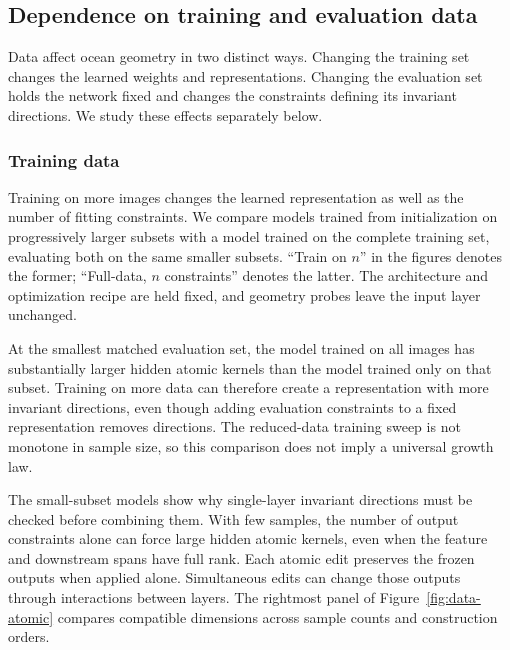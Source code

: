 

\subsection{Dependence on training and evaluation data}
\label{app:data-dependence}
Data affect ocean geometry in two distinct ways. Changing the training set changes the learned weights and representations. Changing the evaluation set holds the network fixed and changes the constraints defining its invariant directions. We study these effects separately below.

\subsubsection{Training data}
\label{app:training-data}
Training on more images changes the learned representation as well as the number of fitting constraints. We compare models trained from initialization on progressively larger subsets with a model trained on the complete training set, evaluating both on the same smaller subsets. ``Train on $n$'' in the figures denotes the former; ``Full-data, $n$ constraints'' denotes the latter. The architecture and optimization recipe are held fixed, and geometry probes leave the input layer unchanged.

At the smallest matched evaluation set, the model trained on all images has substantially larger hidden atomic kernels than the model trained only on that subset. Training on more data can therefore create a representation with more invariant directions, even though adding evaluation constraints to a fixed representation removes directions. The reduced-data training sweep is not monotone in sample size, so this comparison does not imply a universal growth law.




The small-subset models show why single-layer invariant directions must be checked before combining them. With few samples, the number of output constraints alone can force large hidden atomic kernels, even when the feature and downstream spans have full rank. Each atomic edit preserves the frozen outputs when applied alone. Simultaneous edits can change those outputs through interactions between layers. The rightmost panel of Figure~\ref{fig:data-atomic} compares compatible dimensions across sample counts and construction orders. 




